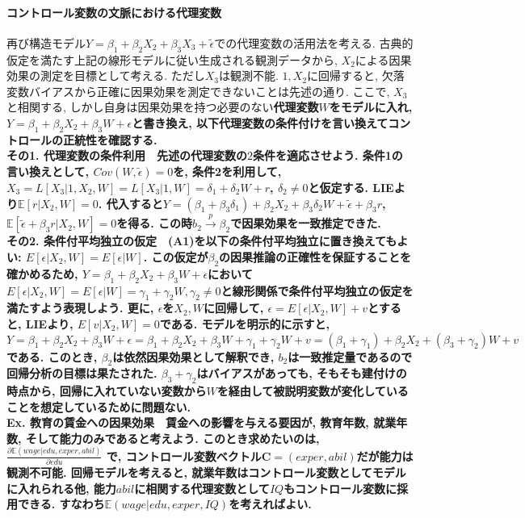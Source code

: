 \documentclass[paper=a4paper,fontsize=10pt]{jlreq}
\begin{document}
\paragraph{コントロール変数の文脈における代理変数}
再び構造モデル$Y=\beta_1+\beta_2X_{2}+\beta_3X_{3}+\tilde{\epsilon}$での代理変数の活用法を考える. 古典的仮定を満たす上記の線形モデルに従い生成される観測データから, $X_2$による因果効果の測定を目標として考える. ただし$X_{3}$は観測不能. $1, X_{2}$に回帰すると, 欠落変数バイアスから正確に因果効果を測定できないことは先述の通り. ここで, $X_{3}$と相関する, しかし自身は因果効果を持つ必要のない\rmfamily\mcfamily\bfseries{代理変数}\mdseries $W$をモデルに入れ, $Y=\beta_1+\beta_2X_{2}+\beta_3W+\epsilon$と書き換え, 以下代理変数の条件付けを言い換えてコントロールの正統性を確認する.\\

\rmfamily\mcfamily\bfseries{その1. 代理変数の条件利用}\mdseries　先述の代理変数の$2$条件を適応させよう. 条件1の言い換えとして, $Cov(W, \tilde{\epsilon})=0$を, 条件2を利用して, $X_3=L[X_3|1, X_2, W]=L[X_3|1, W]=\delta_1 + \delta_2W+r$, $\delta_2\neq0$と仮定する. LIEより$\mathbb{E}[r|X_2, W]=0$. 代入すると$Y=(\beta_1+\beta_3\delta_1)+\beta_2X_{2}+\beta_3\delta_2W+\tilde{\epsilon}+\beta_3r$, $\mathbb{E}[\tilde{\epsilon}+\beta_3r|X_2, W]=0$を得る. この時$b_2 \overset{p}{\to}\beta_2$で因果効果を一致推定できた.\\

\rmfamily\mcfamily\bfseries{その2. 条件付平均独立の仮定}\mdseries　(A1)を以下の\rmfamily\mcfamily\bfseries{条件付平均独立}\mdseries に置き換えてもよい: $E[\epsilon | X_{2}, W]=E[\epsilon| W]$. この仮定が$\beta_2$の因果推論の正確性を保証することを確かめるため, $Y=\beta_1+\beta_2X_{2}+\beta_3W+\epsilon$において$E[\epsilon | X_{2}, W]=E[\epsilon|W]=\gamma_1+\gamma_2W, \gamma_2\neq0$と線形関係で条件付平均独立の仮定を満たすよう表現しよう. 更に, $\epsilon$を$X_{2}, W$に回帰して, $\epsilon=E[\epsilon|X_{2}, W]+v$とすると, LIEより, $E[v|X_{2}, W]=0$である. モデルを明示的に示すと, $Y=\beta_1+\beta_2X_{2}+\beta_3W+\epsilon=\beta_1+\beta_2X_{2}+\beta_3W+\gamma_1+\gamma_2W+v=(\beta_1+\gamma_1)+\beta_2X_{2}+(\beta_3+\gamma_2)W+v$である. このとき, $\beta_2$は依然因果効果として解釈でき, $b_2$は一致推定量であるので回帰分析の目標は果たされた. $\beta_3+\gamma_2$はバイアスがあっても, そもそも建付けの時点から, 回帰に入れていない変数から$W$を経由して被説明変数が変化していることを想定しているために問題ない.\\

\rmfamily\mcfamily\bfseries{Ex. 教育の賃金への因果効果}\mdseries　賃金への影響を与える要因が, 教育年数, 就業年数, そして能力のみであると考えよう. このとき求めたいのは, $\frac{\partial \mathbb{E}(wage|edu, exper, abil)}{\partial edu}$ で, コントロール変数ベクトル$\mathbf{C}=(exper, abil)$だが能力は\rmfamily\mcfamily\bfseries{観測不可能}\mdseries . 回帰モデルを考えると, 就業年数はコントロール変数としてモデルに入れられる他, 能力$abil$に相関する代理変数として$IQ$もコントロール変数に採用できる. すなわち$\mathbb{E}(wage|edu, exper, IQ)$を考えればよい.\\
\end{document}
